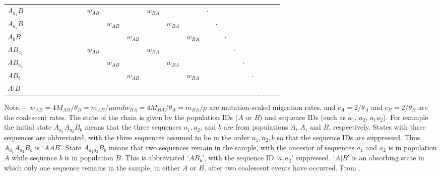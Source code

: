 \documentclass[A4]{article1}
\begin{document}
\begin{table}
\begin{small}
\begin{tabular}{lccccccccccccccccccccccc}
    $A_{a_1}B$ & & & & & & & & & $w_{AB}$ & & & $w_{BA}$ & & & $\cdot$ & & & & & & \\
    $A_{a_2}B$ & & & & & & & & & & $w_{AB}$ & & & $w_{BA}$ & & & $\cdot$ & & & & & \\
    $A_bB$ & & & & & & & & & & & $w_{AB}$ & & & $w_{BA}$ & & & $\cdot$ & & & & \\
    $AB_{a_1}$ & & & & & & & & & $w_{AB}$ & & & $w_{BA}$ & & & & & & $\cdot$ & & & \\
    $AB_{a_2}$ & & & & & & & & & & $w_{AB}$ & & & $w_{BA}$ & & & & & & $\cdot$ & & \\
    $AB_b$ & & & & & & & & & & & $w_{AB}$ & & & $w_{BA}$ & & & & & & $\cdot$ & \\
    $A|B$ & & & & & & & & & & & & & & & & & & & & & $\cdot$ \\
    \bottomrule
\end{tabular}

\noindent Note.--- $w_{AB} = 4M_{AB}/\theta_B = m_{AB}/\mu and w_{BA} = 4M_{BA}/\theta_A =
m_{BA}/\mu$ are mutation-scaled migration rates, and $c_A = 2/\theta_A$ and $c_B =
2/\theta_B$ are the coalescent rates.  The state of the chain is given by the population
IDs ($A$ or $B$) and sequence IDs (such as $a_1$, $a_2$, $a_1a_2$).  For example the
initial state $A_{a_1}A_{a_2}B_b$ means that the three sequences $a_1, a_2$, and $b$ are
from populations $A$, $A$, and $B$, respectively.  States with three sequences are
abbreviated, with the three sequences assumed to be in the order $a_1, a_2, b$ so that the
sequence IDs are suppressed. Thus $A_{a_1}A_{a_2}B_b$ is `$AAB$'.  State $A_{a_1a_2}B_b$
means that two sequences remain in the sample, with the ancestor of sequences $a_1$ and
$a_2$ is in population $A$ while sequence $b$ is in population $B$. This is abbreviated
`$AB_b$', with the sequence ID `$a_1a_2$' suppressed.  `$A|B$' is an absorbing state in
which only one sequence remains in the sample, in either $A$ or $B$, after two coalescent
events have occurred.  From \citet{Leache2019}.
\end{small}
\end{table}
\end{document}
